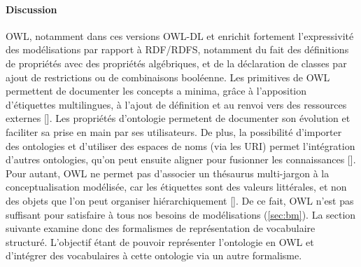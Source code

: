 





\paragraph{Discussion}
OWL, notamment dans ces versions OWL-DL et  enrichit fortement l'expressivité des modélisations par rapport à RDF/RDFS, notamment du fait des définitions de propriétés avec des propriétés algébriques, et de la déclaration de classes par ajout de restrictions ou de combinaisons booléenne.
Les primitives de OWL permettent de documenter les concepts a minima, grâce à l'apposition d'étiquettes multilingues, à l'ajout de définition et au renvoi vers des ressources externes []. 
Les propriétés d'ontologie permetent de documenter son évolution et faciliter sa prise en main par ses utilisateurs.
De plus, la possibilité d'importer des ontologies et d'utiliser des espaces de noms (via les URI) permet l'intégration d'autres ontologies, qu'on peut ensuite aligner pour fusionner les connaissances [].
Pour autant, OWL ne permet pas d'associer un thésaurus multi-jargon à la conceptualisation modélisée, car les étiquettes sont des valeurs littérales, et non des objets que l'on peut organiser hiérarchiquement [].
De ce fait, OWL n'est pas suffisant pour satisfaire à tous nos besoins de modélisations (\ref{sec:bm}).
La section suivante examine donc des formalismes de représentation de vocabulaire structuré.
L'objectif étant de pouvoir représenter l'ontologie en OWL et d'intégrer des vocabulaires à cette ontologie via un autre formalisme.








